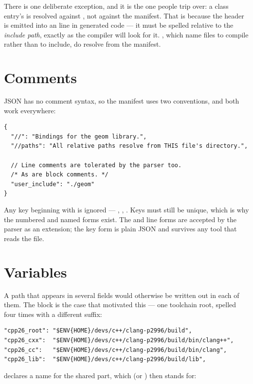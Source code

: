 There is one deliberate exception, and it is the one people trip over: a class
entry's  is resolved against , not against
the manifest. That is because the header is emitted into an
 line in generated code --- it must be spelled relative
to the \emph{include path}, exactly as the compiler will look for it.
, which name files to compile rather than to include, do
resolve from the manifest.

\section{Comments}

JSON has no comment syntax, so the manifest uses two conventions, and both work
everywhere:

\begin{lstlisting}[style=json]
{
  "//": "Bindings for the geom library.",
  "//paths": "All relative paths resolve from THIS file's directory.",

  // Line comments are tolerated by the parser too.
  /* As are block comments. */
  "user_include": "./geom"
}
\end{lstlisting}

Any key beginning with \code{//} is ignored --- , ,
. Keys must still be unique, which is why the numbered and
named forms exist. The \code{//} and \code{/* */} line forms are accepted by
the parser as an extension; the key form is plain JSON and survives any tool
that reads the file.

\section{Variables}
\label{sec:variables}

A path that appears in several fields would otherwise be written out in each of
them. The  block is the case that motivated this --- one
toolchain root, spelled four times with a different suffix:

\begin{lstlisting}[style=json]
"cpp26_root": "$ENV{HOME}/devs/c++/clang-p2996/build",
"cpp26_cxx":  "$ENV{HOME}/devs/c++/clang-p2996/build/bin/clang++",
"cpp26_cc":   "$ENV{HOME}/devs/c++/clang-p2996/build/bin/clang",
"cpp26_lib":  "$ENV{HOME}/devs/c++/clang-p2996/build/lib",
\end{lstlisting}

 declares a name for the shared part, which  (or
) then stands for:

